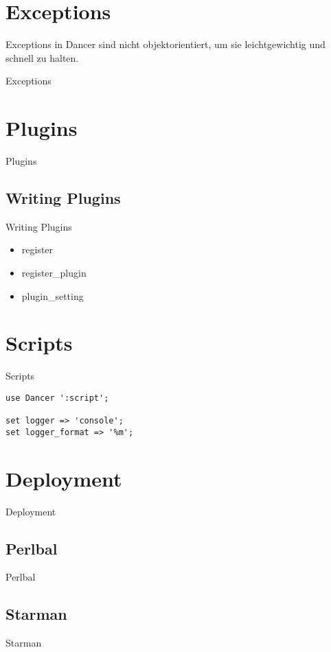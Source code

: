 \section{Exceptions}
Exceptions in Dancer sind nicht objektorientiert, um sie
leichtgewichtig und schnell zu halten.
\begin{frame}{Exceptions}
\end{frame}

\section{Plugins}
\begin{frame}{Plugins}
\end{frame}

\subsection{Writing Plugins}
\begin{frame}{Writing Plugins}
\begin{itemize}
\item register
\item register\_plugin
\item plugin\_setting
\end{itemize}
\end{frame}

\section{Scripts}
\begin{frame}[fragile]{Scripts}
\begin{lstlisting}
use Dancer ':script';

set logger => 'console';
set logger_format => '%m';
\end{lstlisting}
\end{frame}

\section{Deployment}
\begin{frame}{Deployment}
\end{frame}

\subsection{Perlbal}
\begin{frame}{Perlbal}
\end{frame}

\subsection{Starman}
\begin{frame}{Starman}
\end{frame}


